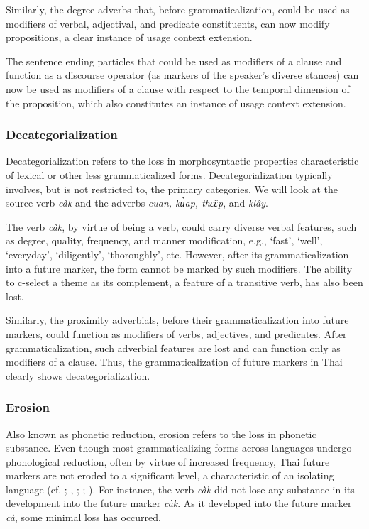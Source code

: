 \documentclass[output=paper,colorlinks,citecolor=brown]{langscibook}
\begin{document}
Similarly, the degree adverbs that, before grammaticalization, could be used as modifiers of verbal, adjectival, and predicate constituents, can now modify propositions, a clear instance of usage context extension. 

The sentence ending particles that could be used as modifiers of a clause and function as a discourse operator (as markers of the speaker’s diverse stances) can now be used as modifiers of a clause with respect to the temporal dimension of the proposition, which also constitutes an instance of usage context extension. 

\subsubsection{Decategorialization}\label{sec:khammee:3.3.3}

Decategorialization refers to the loss in morphosyntactic properties characteristic of lexical or other less grammaticalized forms. Decategorialization typically involves, but is not restricted to, the primary categories. We will look at the source verb \textit{càk} and the adverbs\textit{ cuan, kʉ̀ap, thɛ̂ɛp}, and \textit{klây}.

The verb \textit{càk}, by virtue of being a verb, could carry diverse verbal features, such as degree, quality, frequency, and manner modification, e.g., ‘fast’, ‘well’, ‘everyday’, ‘diligently’, ‘thoroughly’, etc. However, after its grammaticalization into a future marker, the form cannot be marked by such modifiers. The ability to c-select a theme as its complement, a feature of a transitive verb, has also been lost.

Similarly, the proximity adverbials, before their grammaticalization into future markers, could function as modifiers of verbs, adjectives, and predicates. After grammaticalization, such adverbial features are lost and can function only as modifiers of a clause. Thus, the grammaticalization of future markers in Thai clearly shows decategorialization. 

\subsubsection{Erosion}\label{sec:khammee:3.3.4}

Also known as phonetic reduction, erosion refers to the loss in phonetic substance. Even though most grammaticalizing forms across languages undergo phonological reduction, often by virtue of increased frequency, Thai future markers are not eroded to a significant level, a characteristic of an isolating language (cf. \cite{Matisoff1991}; \cite{bisang1996}, \citeyear{Bisang2011}; \cite{Enfield2009}; \cite{ansaldo2018}). For instance, the verb \textit{càk} did not lose any substance in its development into the future marker \textit{càk}. As it developed into the future marker \textit{cà}, some minimal loss has occurred. 
\end{document}

